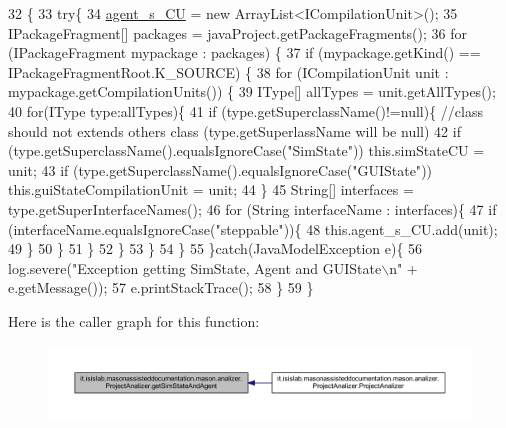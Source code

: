 \begin{DoxyCode}
32                                       \{
33         \textcolor{keywordflow}{try}\{
34             \hyperlink{classit_1_1isislab_1_1masonassisteddocumentation_1_1mason_1_1analizer_1_1_project_analizer_ac580240681056ef8e031f6422c3d5260}{agent\_s\_CU} = \textcolor{keyword}{new} ArrayList<ICompilationUnit>();
35             IPackageFragment[] packages = javaProject.getPackageFragments();
36             \textcolor{keywordflow}{for} (IPackageFragment mypackage : packages) \{
37               \textcolor{keywordflow}{if} (mypackage.getKind() == IPackageFragmentRoot.K\_SOURCE) \{
38                   \textcolor{keywordflow}{for} (ICompilationUnit unit : mypackage.getCompilationUnits()) \{
39                       IType[] allTypes = unit.getAllTypes();
40                       \textcolor{keywordflow}{for}(IType type:allTypes)\{
41                           \textcolor{keywordflow}{if} (type.getSuperclassName()!=null)\{  \textcolor{comment}{//class should not extends others class
       (type.getSuperlassName will be null)}
42                               \textcolor{keywordflow}{if} (type.getSuperclassName().equalsIgnoreCase(\textcolor{stringliteral}{"SimState"}))    this.simStateCU
       = unit;
43                               \textcolor{keywordflow}{if} (type.getSuperclassName().equalsIgnoreCase(\textcolor{stringliteral}{"GUIState"}))    
      this.guiStateCompilationUnit = unit;
44                           \}
45                           String[] interfaces = type.getSuperInterfaceNames();
46                           \textcolor{keywordflow}{for} (String interfaceName : interfaces)\{
47                               \textcolor{keywordflow}{if} (interfaceName.equalsIgnoreCase(\textcolor{stringliteral}{"steppable"}))\{
48                                   this.agent\_s\_CU.add(unit);
49                               \}
50                           \}
51                       \}
52                 \}   
53               \}
54             \}
55         \}\textcolor{keywordflow}{catch}(JavaModelException e)\{
56             log.severe(\textcolor{stringliteral}{"Exception getting SimState, Agent and GUIState\(\backslash\)n"} + e.getMessage());
57             e.printStackTrace();
58         \}
59     \}
\end{DoxyCode}


Here is the caller graph for this function\-:\nopagebreak
\begin{figure}[H]
\begin{center}
\leavevmode
\includegraphics[width=350pt]{classit_1_1isislab_1_1masonassisteddocumentation_1_1mason_1_1analizer_1_1_project_analizer_afcd562563e79077b216ab70ba1ba5dc6_icgraph}
\end{center}
\end{figure}


